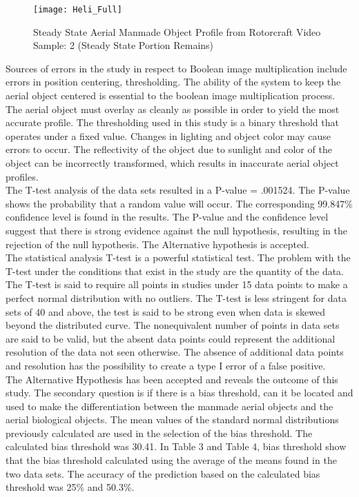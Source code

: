 \begin{figure}[ht]
	\center 
	\texttt{[image: Heli\_Full]}
	\caption[Steady State Aerial Manmade Object Profile]{Steady State Aerial Manmade Object Profile from Rotorcraft Video Sample: 2 (Steady State Portion Remains)}
\end{figure}
\indent Sources of errors in the study in respect to Boolean image multiplication include errors in position centering, thresholding. The ability of the system to keep the aerial object centered is essential to the boolean image multiplication process. The aerial object must overlay as cleanly as possible in order to yield the most accurate profile. The thresholding used in this study is a binary threshold that operates under a fixed value. Changes in lighting and object color may cause errors to occur. The reflectivity of the object due to sunlight and color of the object can be incorrectly transformed, which results in inaccurate aerial object profiles.  \\   
\indent The T-test analysis of the data sets resulted in a P-value = .001524. The P-value shows the probability that a random value will occur. The corresponding 99.847\% confidence level is found in the results. The P-value and the confidence level suggest that there is strong evidence against the null hypothesis, resulting in the rejection of the null hypothesis. The Alternative hypothesis is accepted.\\
\indent The statistical analysis T-test is a powerful statistical test. The problem with the T-test under the conditions that exist in the study are the quantity of the data. The T-test is said to require all points in studies under 15 data points to make a perfect normal distribution with no outliers. The T-test is less stringent for data sets of 40 and above, the test is said to be strong even when data is skewed beyond the distributed curve. The nonequivalent number of points in data sets are said to be valid, but the absent data points could represent the additional resolution of the data not seen otherwise. The absence of additional data points and resolution has the possibility to create a type I error of a false positive. \\ 
\indent The Alternative Hypothesis has been accepted and reveals the outcome of this study. The secondary question is if there is a bias threshold, can it be located and used to make the differentiation between the manmade aerial objects and the aerial biological objects. The mean values of the standard normal distributions previously calculated are used in the selection of the bias threshold. The calculated bias threshold was 30.41. In Table 3 and Table 4, bias threshold show that the bias threshold calculated using the average of the means found in the two data sets. The accuracy of the prediction based on the calculated bias threshold was 25\% and 50.3\%.\\ 
